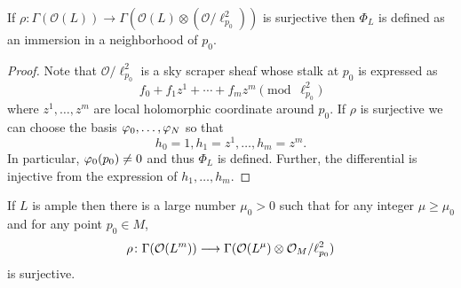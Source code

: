 \documentclass[12pt]{article}
\begin{document}
\begin{lemma}\label{lem:21-immersion}
  If \(\rho\colon\Gamma(\mathcal{O}(L))\to \Gamma(\mathcal{O}(L)\otimes (
  \mathcal{O}/\ell_{p_0}^2))\) is surjective then \(\Phi_L\) is defined as an
  immersion in a neighborhood of \(p_0\).
\end{lemma}
\begin{proof}
  Note that \(\mathcal{O}/\ell_{p_0}^2\) is a sky scraper sheaf whose stalk at
  \(p_0\) is expressed as \[
    f_0+f_1 z^1+\cdots +f_m z^m \pmod{\ell_{p_0}^2}
  \] where \(z^1,\ldots,z^m\) are local holomorphic coordinate around \(p_0\).
  If \(\rho\) is surjective we can choose the basis \(\varphi_0,\ldots,\varphi_N\)
  so that \[
    h_0=1,h_1=z^1,\ldots,h_m=z^m
  .\] In particular, \(\varphi_0(p_0)\neq 0\) and thus \(\Phi_L\) is defined.
  Further, the differential is injective from the expression of
  \(h_1,\ldots,h_m\).
\end{proof}
\begin{lemma}
  If \(L\) is ample then there is a large number \(\mu_0>0\) such that for any
  integer \(\mu\ge \mu_0\) and for any point \(p_0\in M\), \[
    \rho\colon\Gamma(\mathcal{O}(L^m))\longrightarrow \Gamma(\mathcal{O}(L^\mu)\otimes 
    \mathcal{O}_M/\ell_{p_0}^2)
  \] is surjective.
\end{lemma}
\end{document}
